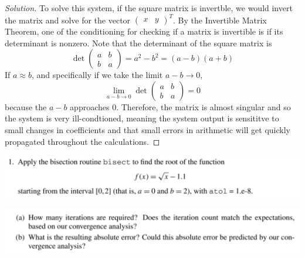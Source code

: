\documentclass[12pt]{scrartcl}
\begin{document}
\begin{proof}[Solution]
  To solve this system, if the square matrix is invertble, we would invert the matrix 
  and solve for the vector $\begin{pmatrix}
    x & y
  \end{pmatrix}^T$. By the Invertible Matrix Theorem, one of the conditioning for checking if a matrix is invertible is if 
  its determinant is nonzero. Note that the determinant of the square matrix is 
  \[\det\begin{pmatrix}
    a & b\\
    b & a
  \end{pmatrix} = a^2 - b^2 = (a-b)(a+b)\]
  If $a \approx b$, and specifically if we take the limit $a-b\to 0$, 
  \[\lim_{a-b\to 0} \det\begin{pmatrix}
    a & b\\ b & a
  \end{pmatrix} = 0\]
  because the $a-b$ approaches $0$. Therefore, the matrix is almost singular and so the system is very ill-condtioned, 
  meaning the system output is sensititve to small changes in coefficients and that small errors in arithmetic will get quickly propagated 
  throughout the calculations. 
\end{proof}

\newpage 

\includegraphics[width=14cm]{1a.png}

\includegraphics[width=14cm]{1b.png}
\end{document}

